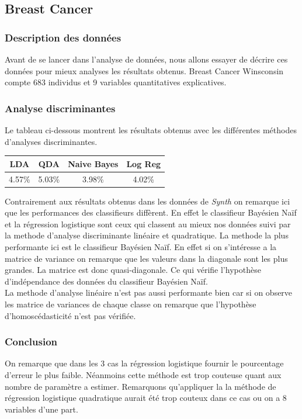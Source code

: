 \documentclass[10pt]{article}
\begin{document}
\subsection{Breast Cancer}
\subsubsection{Description des données}
Avant de se lancer dans l'analyse de données, nous allons essayer de décrire ces données pour mieux analyses les résultats obtenus. Breast Cancer Winsconsin compte 683 individus et 9 variables quantitatives explicatives.
\subsubsection{Analyse discriminantes}
Le tableau ci-dessous montrent les résultats obtenus avec les différentes méthodes d'analyses discriminantes.
\begin{center}
	\begin{tabular}{|c | c | c| c| }
		\hline
	LDA & QDA & Naive Bayes & Log Reg \\
	\hline	
	4.57\% & 5.03\% & 3.98\% & 4.02\%
	\end{tabular}
\end{center}

Contrairement aux résultats obtenus dans les données de \textit{Synth} on remarque ici que les performances des classifieurs diffèrent. En effet le classifieur Bayésien Naïf et la régression logistique sont ceux qui classent au mieux nos données suivi par la methode d'analyse discriminante linéaire et quadratique. 
La methode la plus performante ici est le  classifieur Bayésien Naïf. En effet si on s'intéresse a la matrice de variance  on remarque que les valeurs dans la diagonale sont les plus grandes. La matrice est donc quasi-diagonale. Ce qui vérifie l'hypothèse d'indépendance des données du classifieur Bayésien Naïf. \\
La methode d'analyse linéaire n'est pas aussi performante bien car si on observe les matrice de variances de chaque classe on remarque que l'hypothèse d'homoscédasticité n'est pas vérifiée.

\subsubsection{Conclusion}
On remarque que dans les 3 cas la régression logistique fournir le pourcentage d'erreur le plus faible. Néanmoins cette méthode est trop couteuse quant aux nombre de paramètre a estimer. Remarquons qu'appliquer la la méthode de régression logistique quadratique aurait été trop couteux dans ce cas ou on a 8 variables d'une part. 
\end{document}
